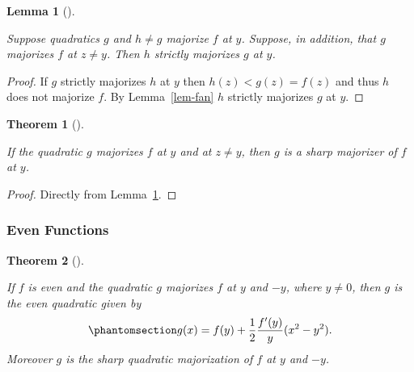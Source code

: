 \documentclass[
  12pt,
  letterpaper,
  DIV=11,
  numbers=noendperiod]{scrartcl}
\theoremstyle{definition}
\theoremstyle{plain}
\newtheorem{theorem}{Theorem}[section]
\theoremstyle{plain}
\newtheorem{lemma}{Lemma}[section]
\theoremstyle{remark}
\begin{document}
\begin{lemma}[]\protect\hypertarget{lem-ruit}{}\label{lem-ruit}

Suppose quadratics \(g\) and \(h\not= g\) majorize \(f\) at \(y\).
Suppose, in addition, that \(g\) majorizes \(f\) at \(z\not=y\). Then
\(h\) strictly majorizes \(g\) at \(y\).

\end{lemma}

\begin{proof}
If \(g\) strictly majorizes \(h\) at \(y\) then \(h(z)<g(z)=f(z)\) and
thus \(h\) does not majorize \(f\). By Lemma~\ref{lem-fan} \(h\)
strictly majorizes \(g\) at \(y\).
\end{proof}

\begin{theorem}[]\protect\hypertarget{thm-ruit}{}\label{thm-ruit}

If the quadratic \(g\) majorizes \(f\) at \(y\) and at \(z\not= y\),
then \(g\) is a sharp majorizer of \(f\) at \(y\).

\end{theorem}

\begin{proof}
Directly from Lemma~\ref{lem-ruit}.
\end{proof}

\subsubsection{Even Functions}\label{even-functions}

\begin{theorem}[]\protect\hypertarget{thm-evqu}{}\label{thm-evqu}

If \(f\) is even and the quadratic \(g\) majorizes \(f\) at \(y\) and
\(-y\), where \(y\not= 0\), then \(g\) is the even quadratic given by
\begin{equation}\phantomsection\label{eq-geven}{
g(x)=f(y)+\frac12\frac{f'(y)}{y}(x^2-y^2).
}\end{equation} Moreover \(g\) is the sharp quadratic majorization of
\(f\) at \(y\) and \(-y\).

\end{theorem}
\end{document}
